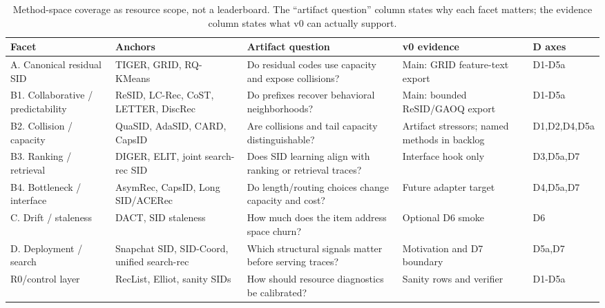 \begin{table}[t]
\caption{Method-space coverage as resource scope, not a leaderboard. The
``artifact question'' column states why each facet matters; the evidence column
states what v0 can actually support.}
\label{tab:method-coverage}
\footnotesize
\setlength{\tabcolsep}{3.2pt}
\begin{tabular}{@{}>{\raggedright\arraybackslash}p{}>{\raggedright\arraybackslash}p{}>{\raggedright\arraybackslash}p{}>{\raggedright\arraybackslash}p{}>{\raggedright\arraybackslash}p{}@{}}
\toprule
Facet & Anchors & Artifact question & v0 evidence & D axes \\
\midrule
A. Canonical residual SID & TIGER, GRID, RQ-KMeans~\cite{rajput2023tiger,ju2025grid} & Do residual codes use capacity and expose collisions? & Main: GRID feature-text export & D1-D5a \\
B1. Collaborative / predictability & ReSID, LC-Rec, CoST, LETTER, DiscRec~\cite{liang2026resid,zheng2023lcrec,zhu2024cost,wang2024letter,liu2025discrec} & Do prefixes recover behavioral neighborhoods? & Main: bounded ReSID/GAOQ export & D1-D5a \\
B2. Collision / capacity & QuaSID, AdaSID, CARD, CapsID~\cite{hu2026quasid,pan2026adasid,wei2026card,cheng2026capsid} & Are collisions and tail capacity distinguishable? & Artifact stressors; named methods in backlog & D1,D2,D4,D5a \\
B3. Ranking / retrieval & DIGER, ELIT, joint search-rec SID~\cite{fu2026diger,liu2024elit,penha2025jointsid} & Does SID learning align with ranking or retrieval traces? & Interface hook only & D3,D5a,D7 \\
B4. Bottleneck / interface & AsymRec, CapsID, Long SID/ACERec~\cite{huang2026asymrec,cheng2026capsid,xia2026acerec} & Do length/routing choices change capacity and cost? & Future adapter target & D4,D5a,D7 \\
C. Drift / staleness & DACT, SID staleness~\cite{feng2026dact,baikalov2026staleness} & How much does the item address space churn? & Optional D6 smoke & D6 \\
D. Deployment / search & Snapchat SID, SID-Coord, unified search-rec~\cite{ju2026snapchatsid,li2026sidcoord,penha2025jointsid} & Which structural signals matter before serving traces? & Motivation and D7 boundary & D5a,D7 \\
R0/control layer & RecList, Elliot, sanity SIDs~\cite{chia2022reclist,anelli2021elliot} & How should resource diagnostics be calibrated? & Sanity rows and verifier & D1-D5a \\
\bottomrule
\end{tabular}
\end{table}

